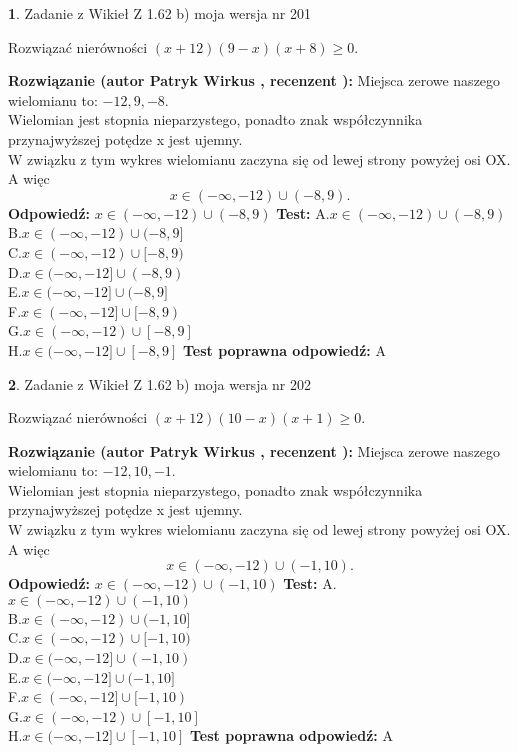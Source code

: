 \documentclass[12pt, a4paper]{article}
\theoremstyle{definition} %
\newtheorem{zad}{}
\newcommand{\zadStart}[1]{\begin{zad}#1\newline}
\newcommand{\zadStop}{\end{zad}}
\newcommand{\rozwStart}[2]{\noindent \textbf{Rozwiązanie (autor #1 , recenzent #2): }\newline}
\newcommand{\rozwStop}{\newline}
\newcommand{\odpStart}{\noindent \textbf{Odpowiedź:}\newline}
\newcommand{\odpStop}{\newline}
\newcommand{\testStart}{\noindent \textbf{Test:}\newline}
\newcommand{\testStop}{\newline}
\newcommand{\kluczStart}{\noindent \textbf{Test poprawna odpowiedź:}\newline}
\newcommand{\kluczStop}{\newline}
\begin{document}
\zadStart{Zadanie z Wikieł Z 1.62 b) moja wersja nr 201}

Rozwiązać nierówności $(x+12)(9-x)(x+8)\ge0$.
\zadStop
\rozwStart{Patryk Wirkus}{}
Miejsca zerowe naszego wielomianu to: $-12, 9, -8$.\\
Wielomian jest stopnia nieparzystego, ponadto znak współczynnika przy\linebreak najwyższej potędze x jest ujemny.\\ W związku z tym wykres wielomianu zaczyna się od lewej strony powyżej osi OX. A więc $$x \in (-\infty,-12) \cup (-8,9).$$
\rozwStop
\odpStart
$x \in (-\infty,-12) \cup (-8,9)$
\odpStop
\testStart
A.$x \in (-\infty,-12) \cup (-8,9)$\\
B.$x \in (-\infty,-12) \cup (-8,9]$\\
C.$x \in (-\infty,-12) \cup [-8,9)$\\
D.$x \in (-\infty,-12] \cup (-8,9)$\\
E.$x \in (-\infty,-12] \cup (-8,9]$\\
F.$x \in (-\infty,-12] \cup [-8,9)$\\
G.$x \in (-\infty,-12) \cup [-8,9]$\\
H.$x \in (-\infty,-12] \cup [-8,9]$
\testStop
\kluczStart
A
\kluczStop



\zadStart{Zadanie z Wikieł Z 1.62 b) moja wersja nr 202}

Rozwiązać nierówności $(x+12)(10-x)(x+1)\ge0$.
\zadStop
\rozwStart{Patryk Wirkus}{}
Miejsca zerowe naszego wielomianu to: $-12, 10, -1$.\\
Wielomian jest stopnia nieparzystego, ponadto znak współczynnika przy\linebreak najwyższej potędze x jest ujemny.\\ W związku z tym wykres wielomianu zaczyna się od lewej strony powyżej osi OX. A więc $$x \in (-\infty,-12) \cup (-1,10).$$
\rozwStop
\odpStart
$x \in (-\infty,-12) \cup (-1,10)$
\odpStop
\testStart
A.$x \in (-\infty,-12) \cup (-1,10)$\\
B.$x \in (-\infty,-12) \cup (-1,10]$\\
C.$x \in (-\infty,-12) \cup [-1,10)$\\
D.$x \in (-\infty,-12] \cup (-1,10)$\\
E.$x \in (-\infty,-12] \cup (-1,10]$\\
F.$x \in (-\infty,-12] \cup [-1,10)$\\
G.$x \in (-\infty,-12) \cup [-1,10]$\\
H.$x \in (-\infty,-12] \cup [-1,10]$
\testStop
\kluczStart
A
\kluczStop
\end{document}
